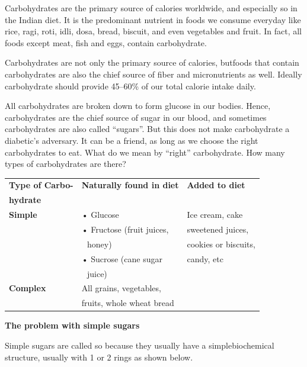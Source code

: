 Carbohydrates are the primary source of calories worldwide, and especially so in the Indian diet. It is the predominant nutrient in foods we consume everyday like rice, ragi, roti, idli, dosa, bread, biscuit, and even vegetables and fruit. In fact, all foods except meat, fish and eggs, contain carbohydrate.

Carbohydrates are not only the primary source of calories, but\break foods that contain carbohydrates are also the chief source of fiber and micronutrients as well. Ideally carbohydrate should provide 45–60\% of our total calorie intake daily.

All carbohydrates are broken down to form glucose in our bodies. Hence, carbohydrates are the chief source of sugar in our blood, and sometimes carbohydrates are also called “sugars”. But this does not make carbohydrate a diabetic’s adversary. It can be a friend, as long as we choose the right carbohydrates to eat. What do we mean by “right” carbohydrate. How many types of carbohydrates are there?

\begin{center}
\begin{tabular}{|l|l|l|}
\hline
\textbf{Type of Carbo-} & \textbf{Naturally found in diet} & \textbf{Added to diet}\\
\textbf{hydrate} & &\\
\hline
\textbf{Simple} & • Glucose & Ice cream, cake\\
\hline
 & • Fructose (fruit juices, & sweetened juices,\\
  & \,\, honey) & cookies or biscuits,\\
  & • Sucrose (cane sugar & candy, etc\\
  & \,\, juice) & \\
\hline
\textbf{Complex} & All grains, vegetables, &\\
 & fruits, whole wheat bread &\\
\hline
\end{tabular}
\end{center}

\noindent\textbf{The problem with simple sugars}

Simple sugars are called so because they usually have a simple\break biochemical structure, usually with 1 or 2 rings as shown below.

